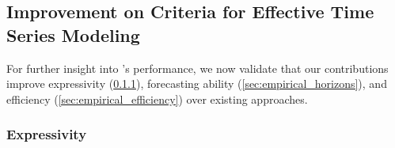 





\subsection{Improvement on Criteria for Effective Time Series Modeling} 
\label{sec:empirical_claims}

For further insight into \ourmethod{}'s performance, we now validate that our contributions improve expressivity (\ref{sec:empirical_expressivity}), forecasting ability (\ref{sec:empirical_horizons}), and efficiency (\ref{sec:empirical_efficiency}) over existing approaches. 


\subsubsection{Expressivity} \label{sec:empirical_expressivity}

